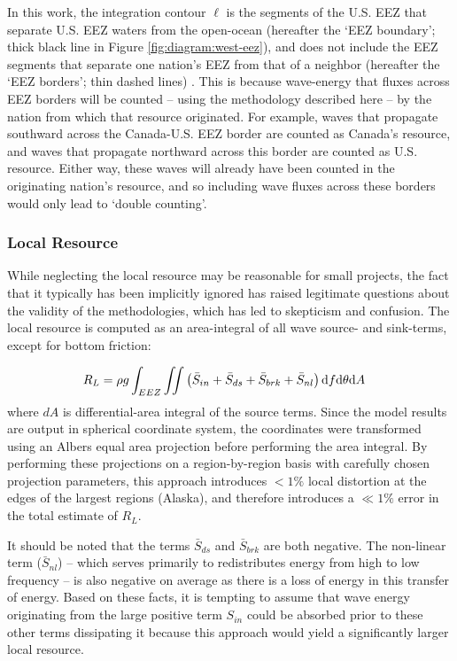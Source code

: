 In this work, the integration contour $\ell$ is the segments of the U.S. EEZ that separate U.S. EEZ waters from the open-ocean (hereafter the `EEZ boundary'; thick black line in Figure \ref{fig:diagram:west-eez}), and does not include the EEZ segments that separate one nation's EEZ from that of a neighbor (hereafter the `EEZ borders'; thin dashed lines) \citep[]{flandersmarineinstituteMaritimeBoundariesGeodatabase2018}. This is because wave-energy that fluxes across EEZ borders will be counted -- using the methodology described here -- by the nation from which that resource originated. For example, waves that propagate southward across the Canada-U.S. EEZ border are counted as Canada's resource, and waves that propagate northward across this border are counted as U.S. resource. Either way, these waves will already have been counted in the originating nation's resource, and so including wave fluxes across these borders would only lead to `double counting'.


\subsubsection{Local Resource} \label{sec:method:calc:local}

While neglecting the local resource may be reasonable for small projects, the fact that it
typically has been implicitly ignored has raised legitimate questions about the validity of the methodologies, which has led to skepticism and confusion. The local resource is computed as an area-integral of all wave source- and sink-terms, except for bottom friction:

\begin{align}
  R_L &= \rho g \int_{EEZ}\iint \left ( \bar{S}_{in} + \bar{S}_{ds} + \bar{S}_{brk} + \bar{S}_{nl} \right ) \mathrm{d} f \mathrm{d} \theta \mathrm{d} A
\label{eqn:RL}
\end{align}
where $dA$ is differential-area integral of the source terms. Since the model results are output in spherical coordinate system, the coordinates were transformed using an Albers equal area projection before performing the area integral. By performing these projections on a region-by-region basis with carefully chosen projection parameters, this approach introduces $<1\% $ local distortion at the edges of the largest regions (Alaska), and therefore introduces a $\ll 1\%$ error in the total estimate of $R_L$.

It should be noted that the terms $\bar{S}_{ds}$ and $\bar{S}_{brk}$ are both negative. The non-linear term ($\bar{S}_{nl}$) -- which serves primarily to redistributes energy from high to low frequency -- is also negative on average as there is a loss of energy in this transfer of energy.
Based on these facts, it is tempting to assume that wave energy originating from the large positive term $S_{in}$ could be absorbed prior to these other terms dissipating it because this approach would yield a significantly larger local resource.

